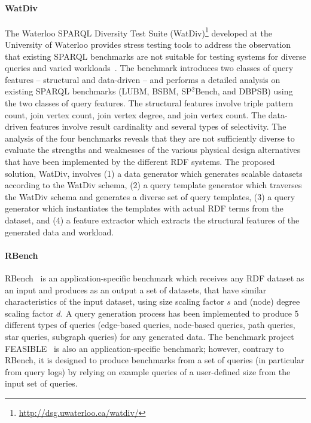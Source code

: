 \paragraph{WatDiv} The Waterloo SPARQL Diversity Test Suite (WatDiv)\footnote{\url{http://dsg.uwaterloo.ca/watdiv/}} developed at the University of Waterloo provides stress testing tools to address the observation that existing SPARQL benchmarks are not suitable for testing systems for diverse queries and varied workloads~\cite{Aluc:2014:DST:2717213.2717229}. The benchmark introduces two classes of query features -- structural and data-driven -- and performs a detailed analysis on existing SPARQL benchmarks (LUBM, BSBM, SP$^2$Bench, and DBPSB) using the two classes of query features. The structural features involve triple pattern count, join vertex count, join vertex degree, and join vertex count. The data-driven features involve result cardinality and several types of selectivity. The analysis of the four benchmarks reveals that they are not sufficiently diverse to evaluate the strengths and weaknesses of the various physical design alternatives that have been implemented by the different RDF systems. The proposed solution, WatDiv, involves (1) a data generator which generates scalable datasets according to the WatDiv schema, (2) a query template generator which traverses the WatDiv schema and generates a diverse set of query templates, (3) a query generator which instantiates the templates with actual RDF terms from the dataset, and (4) a feature extractor which extracts the structural features of the generated data and workload. %

\paragraph{RBench} RBench~\cite{Qiao:2015:RAR:2723372.2746479} is an application-specific benchmark which receives any RDF dataset as an input and produces as an output a set of datasets, that have similar characteristics of the input dataset, using size scaling factor $s$ and (node) degree scaling factor $d$. \iffalse A generated benchmark dataset is considered similar to the given dataset if their values for the dataset evaluation metrics and query evaluation times for different techniques are similar. Three evaluation metrics are utilized for this purpose: dataset coherence (i.e., a measure how uniformly predicates are distributed among the same type/class), relationship specialty (i.e., the number of occurrences of the same predicate associated with each resource), and literal diversity.\fi A query generation process has been implemented to produce 5 different types of queries (edge-based queries, node-based queries, path queries, star queries, subgraph queries) for any generated data. The benchmark project FEASIBLE~\cite{Saleem2015} is also an application-specific benchmark; however, contrary to RBench, it is designed to produce benchmarks from a set of queries (in particular from query logs) by relying on example queries of a user-defined
size from the input set of queries.


